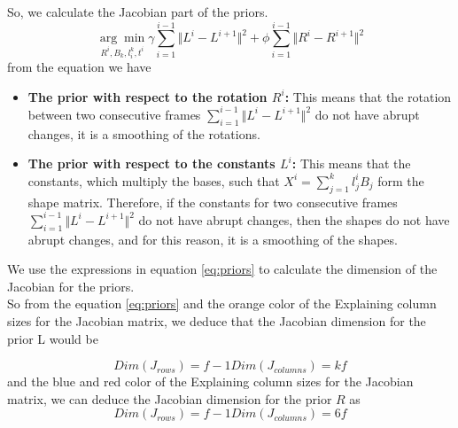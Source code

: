 \noindent So, we calculate the Jacobian part of the priors.\\
\begin{equation}\label{eq:priors}
\underset{R^{i},B_{k},l_{i}^{k},t^{i}}{\arg\min}
\gamma\sum_{i=1}^{i-1}\Vert L^{i}-L^{i+1} \Vert^{2}+
\phi\sum_{i=1}^{i-1}\Vert R^{i}-R^{i+1} \Vert^{2}
\end{equation}
\noindent from the equation we have

\begin{itemize}
\item \textbf{The prior with respect to the rotation $R^{i}$:} This means that the rotation between two consecutive frames $\sum_{i=1}^{i-1}\Vert L^{i}-L^{i+1} \Vert^{2}$ do not have abrupt changes, it is a smoothing of the rotations. 
\item \textbf{The prior with respect to the constants $L^{i}$:} This means that the constants, which multiply the bases, such that $X^{i}=\sum_{j=1}^{k}l^{i}_{j}B_{j}$ form the shape matrix. Therefore, if the constants for two consecutive frames $\sum_{i=1}^{i-1}\Vert L^{i}-L^{i+1} \Vert^{2}$ do not have abrupt changes, then the shapes do not have abrupt changes, and for this reason, it is a smoothing of the shapes.
\end{itemize}

\noindent We use the expressions in equation \ref{eq:priors} to calculate the dimension of the Jacobian for the priors.\\

\noindent So from the equation \ref{eq:priors} and the orange color of the Explaining column sizes for the Jacobian matrix, we deduce that the Jacobian dimension for the prior L would be 

\begin{equation}
Dim(J_{rows})=f-1
Dim(J_{columns})=kf
\end{equation}
\noindent and the blue and red color of the Explaining column sizes for the Jacobian matrix, we can deduce the Jacobian dimension for the prior $R$ as 
\begin{equation}
Dim(J_{rows})=f-1
Dim(J_{columns})=6f
\end{equation}

